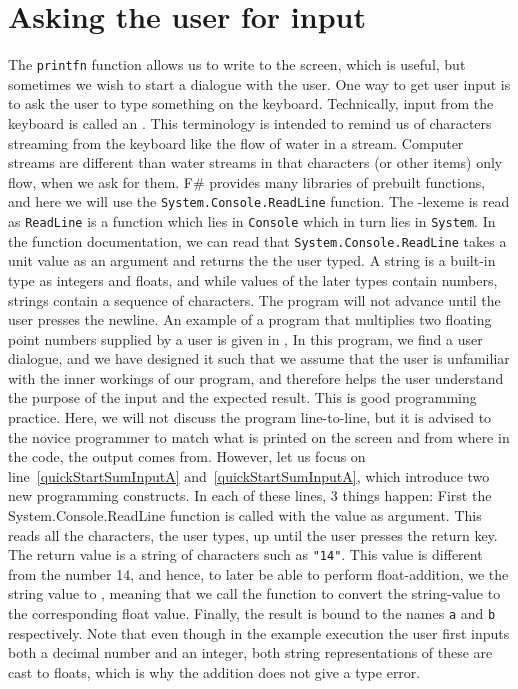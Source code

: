 \documentclass[springer.tex]{subfiles}
\begin{document}
\section{Asking the user for input}
The \lstinline{printfn} function allows us to write to the screen, which is useful, but sometimes we wish to start a dialogue with the user. One way to get user input is to ask the user to type something on the keyboard. Technically, input from the keyboard is called an  . This terminology is intended to remind us of characters streaming from the keyboard like the flow of water in a stream. Computer streams are different than water streams in that characters (or other items) only flow, when we ask for them. F\# provides many libraries of prebuilt functions, and here we will use the \lstinline{System.Console.ReadLine} function. The -lexeme is read as \lstinline{ReadLine} is a function which lies in \lstinline{Console} which in turn lies in \lstinline{System}. In the function documentation, we can read that \lstinline{System.Console.ReadLine} takes a unit value as an argument and returns the  the user typed. A string is a built-in type as integers and floats, and while values of the later types contain numbers, strings contain a sequence of characters. The program will not advance until the user presses the newline. An example of a program that multiplies two floating point numbers supplied by a user is given in ,
% 
%
In this program, we find a user dialogue, and we have designed it such that we assume that the user is unfamiliar with the inner workings of our program, and therefore helps the user understand the purpose of the input and the expected result. This is good programming practice. Here, we will not discuss the program line-to-line, but it is advised to the novice programmer to match what is printed on the screen and from where in the code, the output comes from. However, let us focus on line~\ref{quickStartSumInputA} and~\ref{quickStartSumInputA}, which introduce two new programming constructs. In each of these lines, 3 things happen: First the System.Console.ReadLine function is called with the \lexeme{()} value as argument. This reads all the characters, the user types, up until the user presses the return key. The return value is a string of characters such as \lstinline{"14"}. This value is different from the number 14, and hence, to later be able to perform float-addition, we  the string value to , meaning that we call the function  to convert the string-value to the corresponding float value. Finally, the result is bound to the names \lstinline{a} and \lstinline{b} respectively. Note that even though in the example execution the user first inputs both a decimal number and an integer, both string representations of these are cast to floats, which is why the addition does not give a type error.
\end{document}
